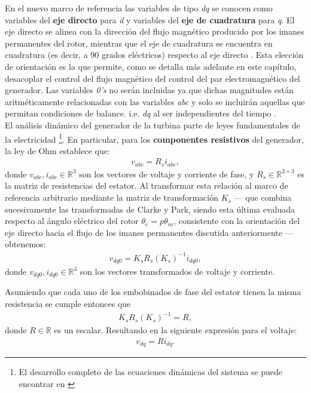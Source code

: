 En el nuevo marco de referencia las variables de tipo \emph{dq} se conocen como variables del \textbf{eje directo} para \emph{d} y variables 
del \textbf{eje de cuadratura} para \emph{q}. El eje directo se alinea con la dirección del flujo magnético producido por los imanes 
permanentes del rotor, mientras que el eje de cuadratura se encuentra en cuadratura (es decir, a 90 grados eléctricos) respecto al eje 
directo \cite{krause2013}. Esta elección de orientación es la que permite, como se detalla más adelante en este capítulo, desacoplar el 
control del flujo magnético del control del par electromagnético del generador. Las variables \emph{0's} no serán incluidas ya que dichas magnitudes están aritméticamente relacionadas
con las variables \emph{abc} y solo se incluirán aquellas que permitan condiciones de balance. i.e. \emph{dq} al ser independientes del tiempo \cite{krause2013,krause1998}.
\\

El análisis dinámico del generador de la turbina parte de leyes fundamentales de la electricidad
\footnote{El desarrollo completo de las ecuaciones dinámicas del sistema se puede encontrar en \cite{krause2013}}. 
En particular, para los \textbf{componentes resistivos} 
del generador, la ley de Ohm establece que:
\begin{align}
    v_{abc} = R_s i_{abc},
\end{align}
donde $v_{abc}, i_{abc} \in \mathbb{R}^3$ son los vectores de voltaje y corriente de fase, y $R_s \in \mathbb{R}^{3\times 3}$ 
es la matriz de resistencias del estator. Al transformar esta relación al marco de referencia arbitrario mediante la matriz 
de transformación $K_s$ --- que combina sucesivamente las transformadas de Clarke y Park, siendo esta última evaluada 
respecto al ángulo eléctrico del rotor $\theta_e = p\theta_m$, consistente con la orientación del eje directo hacia el 
flujo de los imanes permanentes discutida anteriormente --- obtenemos:
\begin{align}
    v_{dq0} = K_sR_s(K_s)^{-1} i_{dq0},
\end{align}
donde $v_{dq0}, i_{dq0} \in \mathbb{R}^3$ son los vectores transformados de voltaje y corriente.

Asumiendo que cada uno de los embobinados de fase del estator tienen la misma resistencia se cumple entonces que
\begin{align}
    K_sR_s(K_s)^{-1} = R,
\end{align}
donde $R \in \mathbb{R}$ es un escalar. Resultando en la siguiente expresión para el voltaje:
\begin{align}
    v_{dq} = R i_{dq}.
\end{align}

